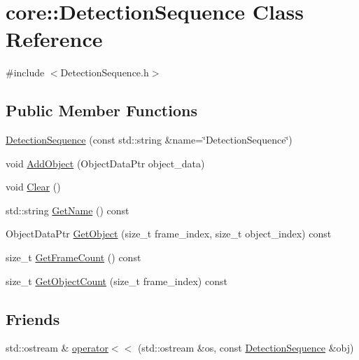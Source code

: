 \hypertarget{classcore_1_1DetectionSequence}{}\section{core\+:\+:Detection\+Sequence Class Reference}
\label{classcore_1_1DetectionSequence}


{\ttfamily \#include $<$Detection\+Sequence.\+h$>$}

\subsection*{Public Member Functions}
\begin{DoxyCompactItemize}
\item 
\hyperlink{classcore_1_1DetectionSequence_a2cbdc8db34fe87932653826fc8a3c1f7}{Detection\+Sequence} (const std\+::string \&name=\char`\"{}Detection\+Sequence\char`\"{})
\item 
void \hyperlink{classcore_1_1DetectionSequence_a3cc0fdf3281f34985f4762086293db72}{Add\+Object} (Object\+Data\+Ptr object\+\_\+data)
\item 
void \hyperlink{classcore_1_1DetectionSequence_ab62569a3e51d58457057deba12ef6892}{Clear} ()
\item 
std\+::string \hyperlink{classcore_1_1DetectionSequence_a8a1af3dee89766d06f4a4f74044082ad}{Get\+Name} () const
\item 
Object\+Data\+Ptr \hyperlink{classcore_1_1DetectionSequence_aab2b72c6e0a9ee14dba99d07116c1d86}{Get\+Object} (size\+\_\+t frame\+\_\+index, size\+\_\+t object\+\_\+index) const
\item 
size\+\_\+t \hyperlink{classcore_1_1DetectionSequence_a2417e4f2652a39245d6f2faa0ce19571}{Get\+Frame\+Count} () const
\item 
size\+\_\+t \hyperlink{classcore_1_1DetectionSequence_a99a1b693215c386c4716df12f6040100}{Get\+Object\+Count} (size\+\_\+t frame\+\_\+index) const
\end{DoxyCompactItemize}
\subsection*{Friends}
\begin{DoxyCompactItemize}
\item 
std\+::ostream \& \hyperlink{classcore_1_1DetectionSequence_a557132cfbb170daf47f5a890a0c5bac0}{operator$<$$<$} (std\+::ostream \&os, const \hyperlink{classcore_1_1DetectionSequence}{Detection\+Sequence} \&obj)
\end{DoxyCompactItemize}


